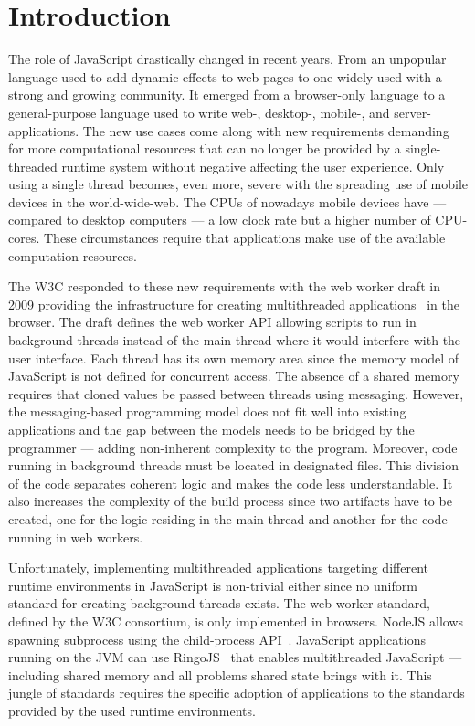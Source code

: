\section{Introduction}\label{sec:introduction}
The role of JavaScript drastically changed in recent years. From an unpopular language used to add dynamic effects to web pages to one widely used with a strong and growing community. It emerged from a browser-only language to a general-purpose language used to write web-, desktop-, mobile-, and server-applications. The new use cases come along with new requirements demanding for more computational resources that can no longer be provided by a single-threaded runtime system without negative affecting the user experience. Only using a single thread becomes, even more, severe with the spreading use of mobile devices in the world-wide-web. The CPUs of nowadays mobile devices have  --- compared to desktop computers --- a low clock rate but a higher number of CPU-cores. These circumstances require that applications make use of the available computation resources. 

The W3C responded to these new requirements with the web worker draft in 2009 providing the infrastructure for creating multithreaded applications~\cite{w3cWebWorker} in the browser. The draft defines the web worker API allowing scripts to run in background threads instead of the main thread where it would interfere with the user interface. Each thread has its own memory area since the  memory model of JavaScript is not defined for concurrent access. The absence of a shared memory requires that cloned values be passed between threads using messaging. However, the messaging-based programming model does not fit well into existing applications and the gap between the models needs to be bridged by the programmer --- adding non-inherent complexity to the program. Moreover, code running in background threads must be located in designated files. This division of the code separates coherent logic and makes the code less understandable. It also increases the complexity of the build process since two artifacts have to be created, one for the logic residing in the main thread and another for the code running in web workers. 

Unfortunately, implementing multithreaded applications targeting different runtime environments in JavaScript is non-trivial either since no uniform standard for creating background threads exists. The web worker standard, defined by the W3C consortium, is only implemented in browsers. NodeJS allows spawning subprocess using the child-process API~\cite{childProcess}. JavaScript applications running on the JVM can use RingoJS~\cite{RingoJS} that enables multithreaded JavaScript --- including shared memory and all problems shared state brings with it. This jungle of standards requires the specific adoption of applications to the standards provided by the used runtime environments.

